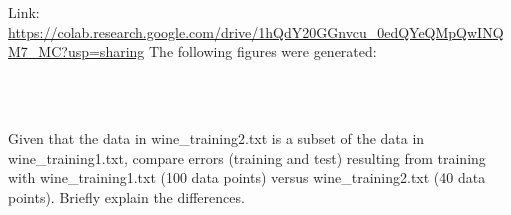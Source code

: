 \begin{solution}
  Link: \url{https://colab.research.google.com/drive/1hQdY20GGnvcu_0edQYeQMpQwINQM7_MC?usp=sharing}
  The following figures were generated:
  \begin{figure}[H]
    \\
    \\
  \end{figure}
\end{solution}

\problem[4]
Given that the data in wine\_training2.txt is a subset of the data in wine\_training1.txt, compare errors (training and test) resulting from training with wine\_training1.txt (100 data points) versus wine\_training2.txt (40 data points). Briefly explain the differences.

